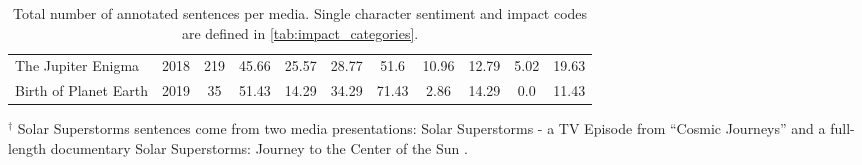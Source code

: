 \begin{table*}[h]
\begin{center}
\begin{tabular} {@{}lcccccccccc@{}}
The Jupiter Enigma & 2018 & 219 & \cellcolor[rgb]{0.491764705882353,0.7219684736639754,0.8547789311803152}45.66 & \cellcolor[rgb]{0.7703191080353711,0.8562091503267973,0.9351018838908113}25.57 & \cellcolor[rgb]{0.7309496347558632,0.8394771241830065,0.9213225682429834}28.77 & \cellcolor[rgb]{0.9855132641291812,0.5330103806228376,0.2125951557093427}51.6 & \cellcolor[rgb]{0.996555171088043,0.9091118800461361,0.8216685890042291}10.96 & \cellcolor[rgb]{0.9960630526720492,0.9016224529027297,0.8071664744329105}12.79 & \cellcolor[rgb]{0.9985236447520185,0.938638985005767,0.8787543252595156}5.02 & \cellcolor[rgb]{0.9938485198000769,0.8529027297193387,0.7097270280661284}19.63 \\ 
Birth of Planet Earth & 2019 & 35 & \cellcolor[rgb]{0.4019530949634756,0.6702960399846213,0.8323260284505959}51.43 & \cellcolor[rgb]{0.8584083044982699,0.9134486735870818,0.9645674740484429}14.29 & \cellcolor[rgb]{0.6620530565167244,0.8101960784313725,0.8972087658592849}34.29 & \cellcolor[rgb]{0.8782929642445213,0.31990772779700116,0.024405997693194924}71.43 & \cellcolor[rgb]{0.9991387927720108,0.9478662053056517,0.8965936178392926}2.86 & \cellcolor[rgb]{0.9955709342560554,0.8907958477508651,0.7855132641291811}14.29 & \cellcolor[rgb]{1.0,0.9607843137254902,0.9215686274509803}0.0 & \cellcolor[rgb]{0.9964321414840446,0.9072664359861592,0.8181007304882737}11.43 \\ 




\hline
\end{tabular}
\end{center}
\footnotesize{$^\dagger$ Solar Superstorms sentences come from two media presentations: Solar Superstorms - a TV Episode from ``Cosmic Journeys'' \citep{solarsuperstorms2013} and a full-length documentary Solar Superstorms: Journey to the Center of the Sun \citep{solarsuperstorms2015}.}\\
\caption{Total number of annotated sentences per media.  Single character sentiment and impact codes are defined in \autoref{tab:impact_categories}.}
\label{tab:movie_info}
\end{table*}






